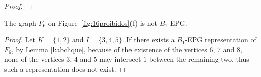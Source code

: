 \documentclass{dmgt}
\begin{document}
\begin{proof}

\end{proof}




\begin{lemma}\label{lem:F_6}
The graph $F_6$ on Figure~\ref{fig:16proibidos}(f) is not   $B_1$-EPG.
\end{lemma}
\begin{proof} Let $K=\{1,2\}$ and $I=\{3,4,5\}$. If there exists a $B_1$-EPG representation of $F_6$,  by Lemma \ref{l:abclique},  because of the existence of the vertices $6$, $7$ and $8$, none of the vertices $3$, $4$ and $5$
may intersect $1$ between the remaining two, thus such a representation does not exist.
 \end{proof} 
\end{document}
